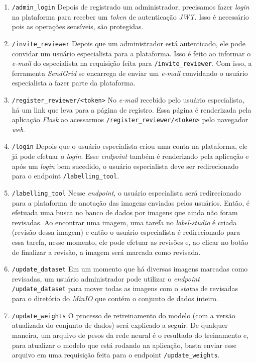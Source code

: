 \begin{enumerate}
    \item \texttt{/admin\_login}
    Depois de registrado um administrador, precisamos fazer \emph{login} na plataforma para receber um \emph{token} de autenticação \emph{JWT}. Isso é necessário pois as operações sensíveis, são protegidas.
    \item \texttt{/invite\_reviewer}
    Depois que um administrador está autenticado, ele pode convidar um usuário especialista para a plataforma. Isso é feito ao informar o \emph{e-mail} do especialista na requisição feita para \texttt{/invite\_reviewer}. Com isso, a ferramenta \emph{SendGrid} se encarrega de enviar um \emph{e-mail} convidando o usuário especialista a fazer parte da plataforma. 
    \item \texttt{/register\_reviewer/<token>}
    No \emph{e-mail} recebido pelo usuário especialista, há um link que leva para a página de registro. Essa página é renderizada pela aplicação \emph{Flask} ao acessarmos \texttt{/register\_reviewer/<token>} pelo navegador \emph{web}.
    \item \texttt{/login}
    Depois que o usuário especialista criou uma conta na plataforma, ele já pode efetuar o \emph{login}. Esse \emph{endpoint} também é renderizado pela aplicação e após um \emph{login} bem sucedido, o usuário especialista deve ser redirecionado para o endpoint \texttt{/labelling\_tool}.
    \item \texttt{/labelling\_tool}
    Nesse \emph{endpoint}, o usuário especialista será redirecionado para a plataforma de anotação das imagens enviadas pelos usuários. Então, é efetuada uma busca no banco de dados por imagens que ainda não foram revisadas. Ao encontrar uma imagem, uma tarefa no \emph{label-studio} é criada (revisão dessa imagem) e então o usuário especialista é redirecionado para essa tarefa, nesse momento, ele pode efetuar as revisões e, ao clicar no botão de finalizar a revisão, a imagem será marcada como revisada.
    \item \texttt{/update\_dataset}
    Em um momento que há diversas imagens marcadas como revisadas, um usuário administrador pode utilizar o \emph{endpoint} \texttt{/update\_dataset} para mover todas as imagens com o \emph{status} de revisadas para o diretório do \emph{MinIO} que contém o conjunto de dados inteiro.
    \item \texttt{/update\_weights}
    O processo de retreinamento do modelo (com a versão atualizada do conjunto de dados) será explicado a seguir. De qualquer maneira, um arquivo de pesos da rede neural é o resultado do treinamento e, para atualizar o modelo que está rodando na aplicação, basta enviar esse arquivo em uma requisição feita para o endpoint \texttt{/update\_weights}.
\end{enumerate}


